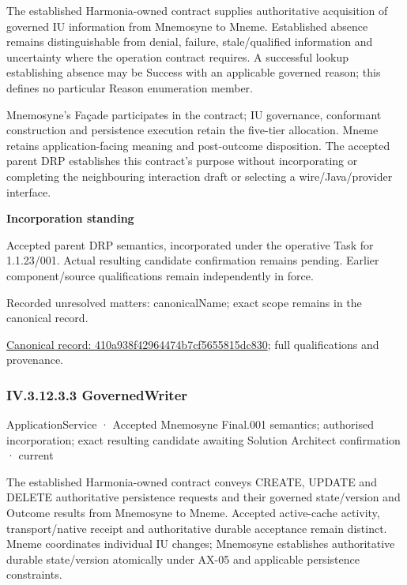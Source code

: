 The established Harmonia-owned contract supplies authoritative acquisition of governed IU information from Mnemosyne to Mneme. Established absence remains distinguishable from denial, failure, stale/qualified information and uncertainty where the operation contract requires. A successful lookup establishing absence may be Success with an applicable governed reason; this defines no particular Reason enumeration member.



Mnemosyne's Façade participates in the contract; IU governance, conformant construction and persistence execution retain the five-tier allocation. Mneme retains application-facing meaning and post-outcome disposition. The accepted parent DRP establishes this contract's purpose without incorporating or completing the neighbouring interaction draft or selecting a wire/Java/provider interface.



\par\medskip\textbf{Incorporation standing}\par


Accepted parent DRP semantics, incorporated under the operative Task for 1.1.23/001. Actual resulting candidate confirmation remains pending. Earlier component/source qualifications remain independently in force.


{\small Recorded unresolved matters: canonicalName; exact scope remains in the canonical record.}\par
{\footnotesize \href{../../../../continuum/application/application-service/410a938f42964474b7cf5655815dc830.md}{Canonical record: 410a938f42964474b7cf5655815dc830}; full qualifications and provenance.}\par
\subsubsection*{IV.3.12.3.3 GovernedWriter}
\label{navigation:IV.3.12.3.3}

\label{element:105f6ebe61f74bc6b51938ba550bc1a7}
{\small ApplicationService · Accepted Mnemosyne Final.001 semantics; authorised incorporation; exact resulting candidate awaiting Solution Architect confirmation · current}\par

The established Harmonia-owned contract conveys CREATE, UPDATE and DELETE authoritative persistence requests and their governed state/version and Outcome results from Mnemosyne to Mneme. Accepted active-cache activity, transport/native receipt and authoritative durable acceptance remain distinct. Mneme coordinates individual IU changes; Mnemosyne establishes authoritative durable state/version atomically under AX-05 and applicable persistence constraints.



